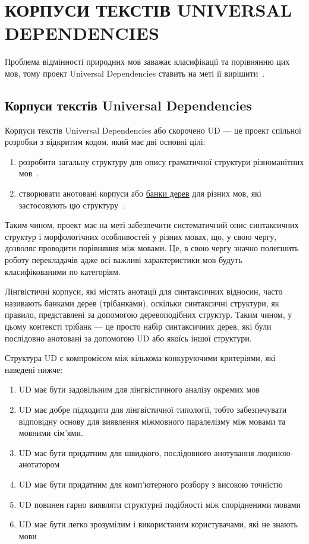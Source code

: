 \section{КОРПУСИ ТЕКСТІВ UNIVERSAL DEPENDENCIES}

Проблема відмінності природних мов заважає класифікації та порівнянню цих мов,
тому проект Universal Dependencies ставить на меті її вирішити~\cite{bib18}.

\subsection{Корпуси текстів Universal Dependencies}
Корпуси текстів Universal Dependencies або скорочено UD — це проект
спільної розробки з відкритим кодом, який має дві основні цілі:

\begin{enumerate}
    \item розробити загальну структуру для опису граматичної структури
    різноманітних мов~\cite{bib1}.
    \item створювати анотовані корпуси або \hyperlink{term0}{банки дерев} для
    різних мов,
    які застосовують цю структуру~\cite{bib2}.
\end{enumerate}

Таким чином, проект має на меті забезпечити систематичний опис синтаксичних структур і
морфологічних особливостей у різних мовах, що, у свою чергу, дозволяє проводити порівняння
між мовами. Це, в свою чергу значно полегшить роботу перекладачів
адже всі важливі характеристики мов будуть класифікованими по категоріям.

Лінгвістичні корпуси, які містять анотації для синтаксичних відносин,
часто називають банками дерев (трібанками), оскільки синтаксичні структури, як правило,
представлені за допомогою деревоподібних структур. Таким чином, у цьому контексті трібанк —
це просто набір синтаксичних дерев, які були послідовно анотовані за допомогою UD
або якоїсь іншої структури.

Структура UD є компромісом між кількома конкуруючими критеріями, які наведені нижче:

\begin{enumerate}
    \item UD має бути задовільним для лінгвістичного аналізу окремих мов
    \item UD має добре підходити для лінгвістичної типології, тобто 
    забезпечувати відповідну основу для виявлення міжмовного паралелізму між
    мовами та мовними сім’ями.
    \item UD має бути придатним для швидкого, послідовного анотування людиною-анотатором
    \item UD має бути придатним для комп'ютерного розбору з високою точністю
    \item UD повинен гарно виявляти структурні подібності між спорідненими мовами
    \item UD має бути легко зрозумілим і використаним користувачами, які не знають мови
\end{enumerate}

